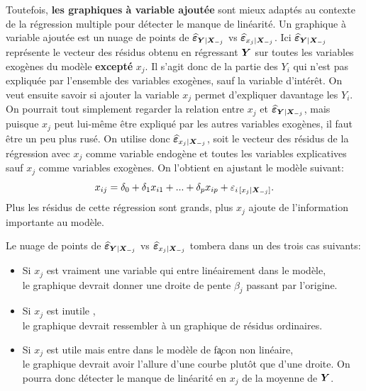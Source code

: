 
Toutefois, \textbf{les graphiques à variable ajoutée} sont mieux adaptés au contexte de la régression multiple pour détecter le manque de linéarité. Un graphique à variable ajoutée est un nuage de points de $\widehat{\bm\varepsilon}_{\bm{Y}|\bm{X}_{-j}}$ vs $\widehat{\bm\varepsilon}_{x_j|\bm{X}_{-j}}$. Ici $\widehat{\bm\varepsilon}_{\bm{Y}|\bm{X}_{-j}}$ représente le vecteur des
résidus obtenu en régressant $\bm{Y}$ sur toutes les variables
exogènes du modèle \textbf{excepté} $x_j$. Il s'agit donc de la partie des $Y_i$ qui n'est pas expliquée par l'ensemble des variables exogènes, sauf la variable d'intérêt.  On veut ensuite savoir si ajouter la variable $x_j$ permet d'expliquer davantage les $Y_i$.  On pourrait tout simplement regarder la relation entre $x_j$ et $\widehat{\bm\varepsilon}_{\bm{Y}|\bm{X}_{-j}}$, mais puisque $x_j$ peut lui-même être expliqué par les autres variables exogènes, il faut être un peu plus rusé. On utilise donc $\widehat{\bm\varepsilon}_{x_j|\bm{X}_{-j}}$, soit le vecteur des résidus de la régression avec $x_j$ comme variable endogène et toutes les variables explicatives sauf $x_j$ comme variables exogènes. On l'obtient en ajustant le modèle suivant:
\begin{equation*}
  x_{ij} = \delta_0+\delta_1x_{i1}+...+\delta_px_{ip} +\varepsilon_{i\,[x_j|\bm{X}_{-j}]}.
\end{equation*}
Plus les résidus de cette régression sont grands, plus $x_j$ ajoute de l'information importante au modèle.

Le nuage de points de $\widehat{\bm\varepsilon}_{\bm{Y}|\bm{X}_{-j}}$ vs $\widehat{\bm\varepsilon}_{x_j|\bm{X}_{-j}}$ tombera dans un des trois cas suivants:
\begin{itemize}
\item Si $x_j$ est vraiment une variable qui entre linéairement dans le modèle, \\
 le graphique devrait donner une droite de pente $\beta_j$ passant par l'origine.
\item  Si $x_j$ est \og inutile \fg, \\
le graphique devrait ressembler à un graphique de
résidus ordinaires.
\item  Si $x_j$ est utile mais entre dans le modèle de fa\c{}con non linéaire,\\
 le graphique devrait avoir l'allure d'une courbe plut\^ot que d'une droite.  On pourra donc détecter le manque de linéarité en $x_j$ de la moyenne de $\bm{Y}$.
\end{itemize}

